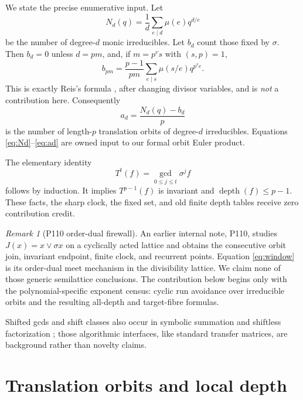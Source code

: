 \documentclass[10pt,a4paper]{amsart}
\theoremstyle{definition}
\theoremstyle{remark}
\newtheorem{remark}[theorem]{Remark}
\newcommand{\depth}{\operatorname{depth}}
\begin{document}
We state the precise enumerative input.  Let
\begin{equation}\label{eq:Nd}
 N_d(q)=\frac1d\sum_{e\mid d}\mu(e)q^{d/e}
\end{equation}
be the number of degree-$d$ monic irreducibles.  Let $b_d$ count those
fixed by $\sigma$.  Then $b_d=0$ unless $d=pm$, and, if
$m=p^v s$ with $(s,p)=1$,
\begin{equation}\label{eq:bd}
 b_{pm}=\frac{p-1}{pm}\sum_{e\mid s}\mu(s/e)q^{p^v e}.
\end{equation}
This is exactly Reis's formula
\cite[Theorem~2(c)]{Reis2018}, after changing divisor variables, and is
\emph{not} a contribution here.  Consequently
\begin{equation}\label{eq:ad}
                  a_d=\frac{N_d(q)-b_d}{p}
\end{equation}
is the number of length-$p$ translation orbits of degree-$d$
irreducibles.  Equations \eqref{eq:Nd}--\eqref{eq:ad} are owned input to our
formal orbit Euler product.

The elementary identity
\begin{equation}\label{eq:window}
 T^t(f)=\gcd_{0\leq j\leq t}\sigma^j f
\end{equation}
follows by induction.  It implies $T^{p-1}(f)$ is invariant and
$\depth(f)\leq p-1$.  These facts, the sharp clock, the fixed set, and old
finite depth tables receive zero contribution credit.

\begin{remark}[P110 order-dual firewall]\label{rem:p110}
An earlier internal note, P110, studies $J(x)=x\vee\sigma x$ on a cyclically
acted lattice and obtains the consecutive orbit join, invariant endpoint,
finite clock, and recurrent points.  Equation \eqref{eq:window} is its
order-dual meet mechanism in the divisibility lattice.  We claim none of
those generic semilattice conclusions.  The contribution below begins only
with the polynomial-specific exponent census: cyclic run avoidance over
irreducible orbits and the resulting all-depth and target-fibre formulas.
\end{remark}

Shifted gcds and shift classes also occur in symbolic summation and
shiftless factorization \cite{GerhardEtAl2003}; those algorithmic
interfaces, like standard transfer matrices, are background rather than
novelty claims.

\section{Translation orbits and local depth}
\end{document}
